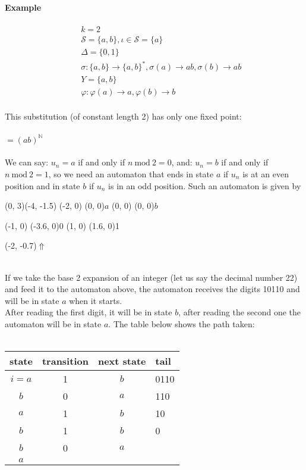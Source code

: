 \documentclass{article}
\begin{document}
\paragraph{Example}
\begin{eqnarray*}
&&k = 2\\
&&\mathcal{S} = \{a, b\}, \iota \in \mathcal{S} = \{a\}\\
&&\Delta = \{0, 1\}\\
&&\sigma:\{a, b\} \to \{a, b\}^*, \sigma(a) \to ab,
\sigma(b) \to ab\\
&&Y = \{a, b\}\\
&&\varphi: \varphi(a) \to a, \varphi(b) \to b
\end{eqnarray*}
\\
This substitution (of constant length 2) has only one fixed point:\\
\\
$= (ab)^\mathbb{N}$\\
\\
We can say: $u_n = a$ if and only if $n \mathrm{\ mod\ } 2 = 0$, and:
$u_n = b$ if and only if $n \mathrm{\ mod\ } 2 = 1$, so we need an automaton
that ends in state $a$ if $u_n$ is at an even position and in state $b$ if
$u_n$ is in an odd position. Such an automaton is given by\\
\begin{graph}(0, 3)(-4, -1.5)
  (-2, 0) (0, 0){$a$}
  (0, 0)  (0, 0){$b$}

  (-1, 0) \freetext(-3.6, 0){0}
   
   
  (1, 0) \freetext(1.6, 0){1}

  \freetext(-2, -0.7){$\Uparrow$}
\end{graph}\\
If we take the base 2 expansion of an integer (let us say the decimal
number 22) and feed it to the automaton above, the automaton receives the
digits 10110 and will be in state $a$ when it starts.\\
After reading the first digit, it will be in state $b$, after reading the
second one the automaton will be in state $a$. The table below shows the path
taken:\\
\\
\begin{tabular}{c|c|c|l}
state & transition & next state & tail\\
\hline
$i=a$ & 1 & $b$ & 0110\\
$b$   & 0 & $a$ & 110\\
$a$   & 1 & $b$ & 10\\
$b$   & 1 & $b$ & 0\\
$b$   & 0 & $a$ &\\
$a$   &   &   &
\end{tabular}\\
\end{document}
